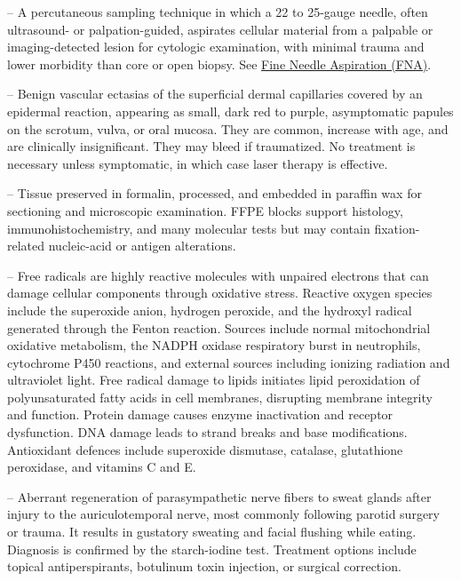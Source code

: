 -- A percutaneous sampling technique in which a 22 to 25-gauge needle, often ultrasound- or palpation-guided, aspirates cellular material from a palpable or imaging-detected lesion for cytologic examination, with minimal trauma and lower morbidity than core or open biopsy. See \hyperlink{Fine Needle Aspiration (FNA)}{Fine Needle Aspiration (FNA)}.

-- Benign vascular ectasias of the superficial dermal capillaries covered by an epidermal reaction, appearing as small, dark red to purple, asymptomatic papules on the scrotum, vulva, or oral mucosa. They are common, increase with age, and are clinically insignificant. They may bleed if traumatized. No treatment is necessary unless symptomatic, in which case laser therapy is effective.

-- Tissue preserved in formalin, processed, and embedded in paraffin wax for sectioning and microscopic examination. FFPE blocks support histology, immunohistochemistry, and many molecular tests but may contain fixation-related nucleic-acid or antigen alterations.

-- Free radicals are highly reactive molecules with unpaired electrons that can damage cellular components through oxidative stress. Reactive oxygen species include the superoxide anion, hydrogen peroxide, and the hydroxyl radical generated through the Fenton reaction. Sources include normal mitochondrial oxidative metabolism, the NADPH oxidase respiratory burst in neutrophils, cytochrome P450 reactions, and external sources including ionizing radiation and ultraviolet light. Free radical damage to lipids initiates lipid peroxidation of polyunsaturated fatty acids in cell membranes, disrupting membrane integrity and function. Protein damage causes enzyme inactivation and receptor dysfunction. DNA damage leads to strand breaks and base modifications. Antioxidant defences include superoxide dismutase, catalase, glutathione peroxidase, and vitamins C and E.

-- Aberrant regeneration of parasympathetic nerve fibers to sweat glands after injury to the auriculotemporal nerve, most commonly following parotid surgery or trauma. It results in gustatory sweating and facial flushing while eating. Diagnosis is confirmed by the starch-iodine test. Treatment options include topical antiperspirants, botulinum toxin injection, or surgical correction.

